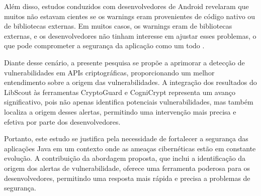 Além disso, estudos conduzidos com desenvolvedores de Android revelaram que muitos não estavam cientes se os warnings eram provenientes de código nativo ou de bibliotecas externas. Em muitos casos, os warnings eram de bibliotecas externas, e os desenvolvedores não tinham interesse em ajustar esses problemas, o que pode comprometer a segurança da aplicação como um todo \cite{perception_developers}.

Diante desse cenário, a presente pesquisa se propõe a aprimorar a detecção de vulnerabilidades em APIs criptográficas, proporcionando um melhor entendimento sobre a origem das vulnerabilidades. A integração dos resultados do LibScout às ferramentas CryptoGuard e CogniCrypt representa um avanço significativo, pois não apenas identifica potenciais vulnerabilidades, mas também localiza a origem desses alertas, permitindo uma intervenção mais precisa e efetiva por parte dos desenvolvedores.

Portanto, este estudo se justifica pela necessidade de fortalecer a segurança das aplicações Java em um contexto onde as ameaças cibernéticas estão em constante evolução. A contribuição da abordagem proposta, que inclui a identificação da origem dos alertas de vulnerabilidade, oferece uma ferramenta poderosa para os desenvolvedores, permitindo uma resposta mais rápida e precisa a problemas de segurança.
